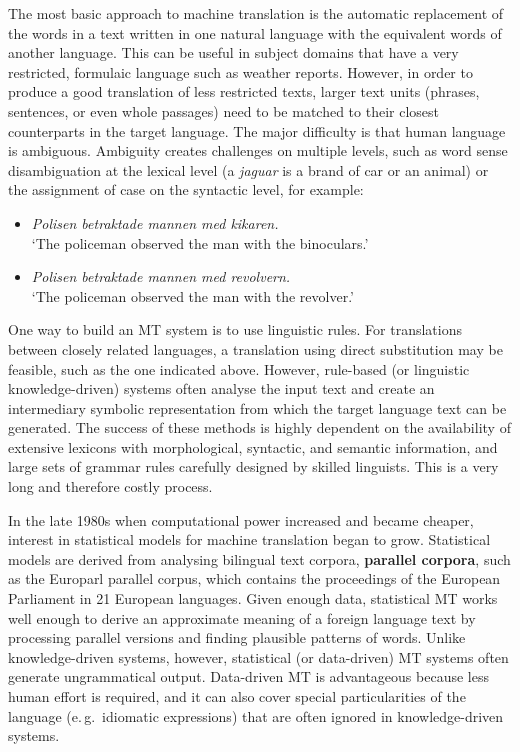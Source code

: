 \begin{multicols}{2}

The most basic approach to machine translation is the automatic replacement of the words in a text written in one natural language with the equivalent words of another language. This can be useful in subject domains that have a very restricted, formulaic language such as weather reports. However, in order to produce a good translation of less restricted texts, larger text units (phrases, sentences, or even whole passages) need to be matched to their closest counterparts in the target language. The major difficulty is that human language is ambiguous. Ambiguity creates challenges on multiple levels, such as word sense disambiguation at the lexical level (a \textit{jaguar} is a brand of car or an animal) or the assignment of case on the syntactic level, for example:

\begin{itemize}
\item \textit{Polisen betraktade mannen med kikaren.}
\\`The policeman observed the man with the binoculars.'
\item \textit{Polisen betraktade mannen med revolvern.}
\\`The policeman observed the man with the revolver.'
\end{itemize}

One way to build an MT system is to use linguistic rules. For translations between closely related languages, a translation using direct substitution may be feasible, such as the one indicated above. However, rule-based (or linguistic knowledge-driven) systems often analyse the input text and create an intermediary symbolic representation from which the target language text can be generated. The success of these methods is highly dependent on the availability of extensive lexicons with morphological, syntactic, and semantic information, and large sets of grammar rules carefully designed by skilled linguists. This is a very long and therefore costly process.

In the late 1980s when computational power increased and became cheaper, interest in statistical models for machine translation began to grow. Statistical models are derived from analysing bilingual text corpora, \textbf{parallel corpora}, such as the Europarl parallel corpus, which contains the proceedings of the European Parliament in 21 European languages. Given enough data, statistical MT works well enough to derive an approximate meaning of a foreign language text by processing parallel versions and finding plausible patterns of words. Unlike knowledge-driven systems, however, statistical (or data-driven) MT systems often generate ungrammatical output. Data-driven MT is advantageous because less human effort is required, and it can also cover special particularities of the language (e.\,g.~idiomatic expressions) that are often ignored in knowledge-driven systems. 


\end{multicols}
